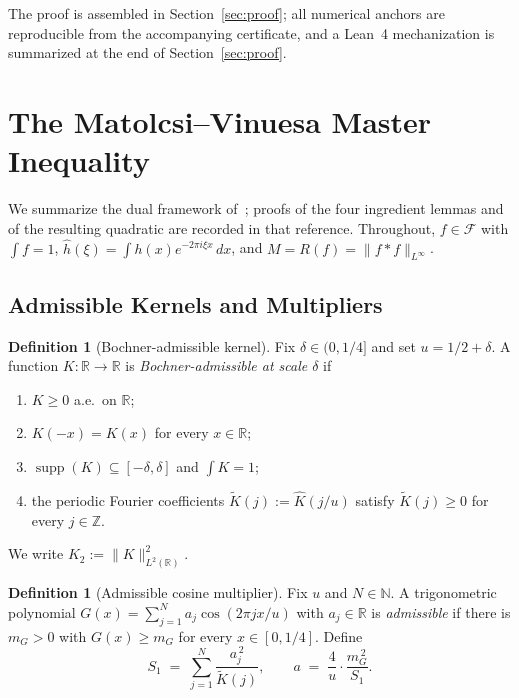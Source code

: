 \documentclass[11pt, letterpaper]{article}
\theoremstyle{plain}
\theoremstyle{definition}
\newtheorem{definition}[theorem]{Definition}
\newcommand{\R}{\mathbb{R}}
\newcommand{\N}{\mathbb{N}}
\newcommand{\Z}{\mathbb{Z}}
\newcommand{\Linf}{L^\infty}
\newcommand{\supp}{\operatorname{supp}}
\begin{document}
The proof is assembled in Section~\ref{sec:proof}; all numerical
anchors are reproducible from the accompanying certificate, and a
Lean~4 mechanization is summarized at the end of
Section~\ref{sec:proof}.

\section{The Matolcsi--Vinuesa Master Inequality}\label{sec:mv}

We summarize the dual framework of~\cite[\S 3]{MV10}; proofs of the
four ingredient lemmas and of the resulting quadratic are recorded
in that reference.  Throughout, $f\in\mathcal{F}$ with $\int f=1$,
$\widehat{h}(\xi)=\int h(x)e^{-2\pi i\xi x}\,dx$, and
$M=R(f)=\|f*f\|_{\Linf}$.

\subsection{Admissible Kernels and Multipliers}\label{subsec:mv-defs}

\begin{definition}[Bochner-admissible kernel]
\label{def:bochner}
Fix $\delta\in(0,1/4]$ and set $u=1/2+\delta$.  A function
$K:\R\to\R$ is \emph{Bochner-admissible at scale $\delta$} if
\begin{enumerate}[label=\textnormal{(K\arabic*)}, leftmargin=2.4em]
\item $K\ge 0$ a.e.\ on $\R$;
\item $K(-x)=K(x)$ for every $x\in\R$;
\item $\supp(K)\subseteq[-\delta,\delta]$ and $\int K=1$;
\item the periodic Fourier coefficients
      $\widetilde{K}(j):=\widehat{K}(j/u)$ satisfy
      $\widetilde{K}(j)\ge 0$ for every $j\in\Z$.
\end{enumerate}
We write $K_2:=\|K\|_{L^2(\R)}^2$.
\end{definition}

\begin{definition}[Admissible cosine multiplier]
\label{def:multiplier}
Fix $u$ and $N\in\N$.  A trigonometric polynomial
$G(x)=\sum_{j=1}^{N}a_j\cos(2\pi jx/u)$ with $a_j\in\R$ is
\emph{admissible} if there is $m_G>0$ with $G(x)\ge m_G$ for every
$x\in[0,1/4]$.  Define
\begin{equation}\label{eq:S1-a}
  S_1 \;=\; \sum_{j=1}^{N}\frac{a_j^{\,2}}{\widetilde{K}(j)},
  \qquad
  a \;=\; \frac{4}{u}\cdot\frac{m_G^{\,2}}{S_1}.
\end{equation}
\end{definition}
\end{document}
